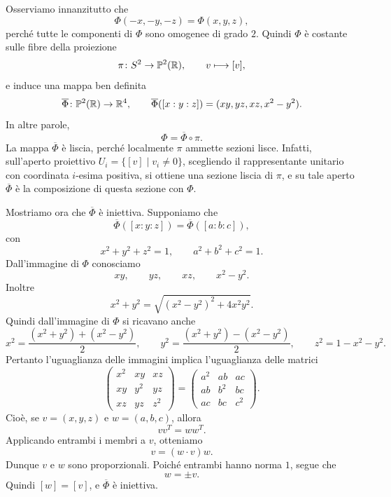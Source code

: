 \documentclass[a4paper]{article}
\begin{document}
\begin{snippetproof}{}
    Osserviamo innanzitutto che
    \[
        \Phi(-x,-y,-z)=\Phi(x,y,z),
    \]
    perché tutte le componenti di \(\Phi\) sono omogenee di grado \(2\). Quindi \(\Phi\) è costante sulle fibre della proiezione
    \[
        \pi\colon S^2\to\mathbb P^2(\mathbb{R}),
        \qquad
        v\longmapsto [v],
    \]
    e induce una mappa ben definita
    \[
        \overline\Phi\colon\mathbb P^2(\mathbb{R})\to\mathbb{R}^4,
        \qquad
        \overline\Phi([x:y:z])=(xy,yz,xz,x^2-y^2).
    \]
    In altre parole,
    \[
        \Phi=\overline\Phi\circ\pi.
    \]
    La mappa \(\overline\Phi\) è liscia, perché localmente \(\pi\) ammette sezioni lisce. Infatti, sull'aperto proiettivo \(U_i=\{[v]\mid v_i\neq0\}\), scegliendo il rappresentante unitario con coordinata \(i\)-esima positiva, si ottiene una sezione liscia di \(\pi\), e su tale aperto \(\overline\Phi\) è la composizione di questa sezione con \(\Phi\).

    Mostriamo ora che \(\overline\Phi\) è iniettiva. Supponiamo che
    \[
        \overline\Phi([x:y:z])=\overline\Phi([a:b:c]),
    \]
    con
    \[
        x^2+y^2+z^2=1,
        \qquad
        a^2+b^2+c^2=1.
    \]
    Dall'immagine di \(\Phi\) conosciamo
    \[
        xy,
        \qquad
        yz,
        \qquad
        xz,
        \qquad
        x^2-y^2.
    \]
    Inoltre
    \[
        x^2+y^2=\sqrt{(x^2-y^2)^2+4x^2y^2}.
    \]
    Quindi dall'immagine di \(\Phi\) si ricavano anche
    \[
        x^2=\frac{(x^2+y^2)+(x^2-y^2)}{2},
        \qquad
        y^2=\frac{(x^2+y^2)-(x^2-y^2)}{2},
        \qquad
        z^2=1-x^2-y^2.
    \]
    Pertanto l'uguaglianza delle immagini implica l'uguaglianza delle matrici
    \[
        \begin{pmatrix}
            x^2 & xy & xz\\
            xy & y^2 & yz\\
            xz & yz & z^2
        \end{pmatrix}
        =
        \begin{pmatrix}
            a^2 & ab & ac\\
            ab & b^2 & bc\\
            ac & bc & c^2
        \end{pmatrix}.
    \]
    Cioè, se \(v=(x,y,z)\) e \(w=(a,b,c)\), allora
    \[
        vv^T=ww^T.
    \]
    Applicando entrambi i membri a \(v\), otteniamo
    \[
        v=(w\cdot v)w.
    \]
    Dunque \(v\) e \(w\) sono proporzionali. Poiché entrambi hanno norma \(1\), segue che
    \[
        w=\pm v.
    \]
    Quindi \([w]=[v]\), e \(\overline\Phi\) è iniettiva.


\end{snippetproof}
\end{document}
